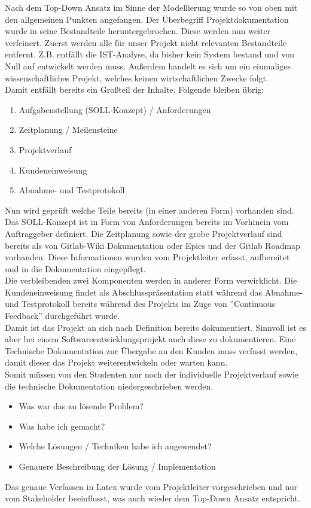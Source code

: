 Nach dem Top-Down Ansatz im Sinne der Modellierung wurde so von oben mit den allgemeinen Punkten angefangen. Der Überbegriff Projektdokumentation wurde in seine Bestandteile heruntergebrochen. Diese werden nun weiter verfeinert. Zuerst werden alle für unser Projekt nicht relevanten Bestandteile entfernt. Z.B. entfällt die IST-Analyse, da bisher kein System bestand und von Null auf entwickelt werden muss. Außerdem handelt es sich um ein einmaliges wissenschaftliches Projekt, welches keinen wirtschaftlichen Zwecke folgt.\\Damit entfällt bereits ein Großteil der Inhalte. Folgende bleiben übrig:
\begin{enumerate}
    \item Aufgabenstellung (SOLL-Konzept) / Anforderungen
    \item Zeitplanung / Meilensteine
    \item Projektverlauf
    \item Kundeneinweisung
    \item Abnahme- und Testprotokoll
\end{enumerate}
Nun wird geprüft welche Teile bereits (in einer anderen Form) vorhanden sind. Das SOLL-Konzept ist in Form von Anforderungen bereits im Vorhinein vom Auftraggeber definiert. Die Zeitplanung sowie der grobe Projektverlauf sind bereits als von Gitlab-Wiki Dokumentation oder Epics und der Gitlab Roadmap vorhanden. Diese Informationen wurden vom Projektleiter erfasst, aufbereitet und in die Dokumentation eingepflegt.\\
Die verbleibenden zwei Komponenten werden in anderer Form verwirklicht. Die Kundeneinweisung findet als  Abschlusspräsentation statt während das Abnahme- und Testprotokoll bereits während des Projekts im Zuge von ”Continuous Feedback” durchgeführt wurde.\\
Damit ist das Projekt an sich nach Definition bereits dokumentiert. Sinnvoll ist es aber bei einem Softwareentwicklungsprojekt auch diese zu dokumentieren. Eine Technische Dokumentation zur Übergabe an den Kunden muss verfasst werden, damit dieser das Projekt weiterentwickeln oder warten kann.\\
Somit müssen von den Studenten nur noch der individuelle Projektverlauf sowie die technische Dokumentation niedergeschrieben werden.
\begin{itemize}
    \item Was war das zu lösende Problem?
    \item Was habe ich gemacht?
    \item Welche Lösungen / Techniken habe ich angewendet?
    \item Genauere Beschreibung der Lösung / Implementation
\end{itemize}
Das genaue Verfassen in Latex wurde vom Projektleiter vorgeschrieben und nur vom Stakeholder beeinflusst, was auch wieder dem Top-Down Ansatz entspricht.